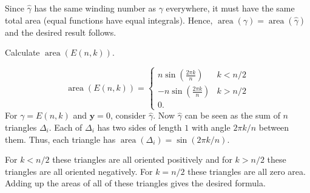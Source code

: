 \documentclass[12 pt, letterpaper]{hmcpset}
\begin{document}
\begin{solution}
\begin{enumerate}
			Since $\hat{\gamma}$ has the same winding number as $\gamma$ everywhere, it must have the same total area (equal functions have equal integrals). Hence, $\operatorname{area}(\gamma) = \operatorname{area}(\hat{\gamma})$ and the desired result follows.
	\end{enumerate}
\end{solution}

\pagebreak

\begin{problem}[9.]
	Calculate $\operatorname{area}(E(n, k))$.
\end{problem}

\begin{solution}
	\[
		\boxed{
			\operatorname{area}(E(n, k)) = \begin{cases}
				n \sin{\left ( \frac{2 \pi k}{n} \right )} & k < n/2 \\
				- n \sin{\left ( \frac{2 \pi k}{n} \right )} & k > n/2 \\
				0.
			\end{cases}
		}
	\]
	For $\gamma = E(n, k)$ and $\mathbf{y} = 0$, consider $\hat{\gamma}$. Now $\hat{\gamma}$ can be seen as the sum of $n$ triangles $\Delta_{i}$. Each of $\Delta_{i}$ has two sides of length $1$ with angle $2 \pi k / n$ between them. Thus, each triangle has $\operatorname{area}(\Delta_{i}) = \sin{(2 \pi k / n)}$. 

	For $k < n / 2$ these triangles are all oriented positively and for $k > n / 2$ these triangles are all oriented negatively. For $k = n / 2$ these triangles are all zero area. Adding up the areas of all of these triangles gives the desired formula.
\end{solution}
\end{document}
